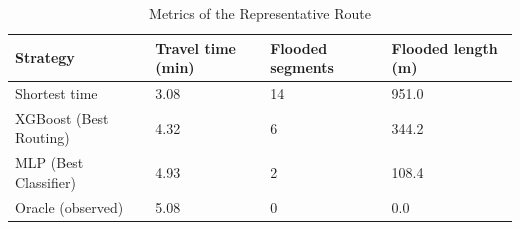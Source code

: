 \begin{table}
\caption{Metrics of the Representative Route}
\label{tab:rep_route}
\begin{tabular}{llll}
\toprule
Strategy & Travel time (min) & Flooded segments & Flooded length (m) \\
\midrule
Shortest time & 3.08 & 14 & 951.0 \\
XGBoost (Best Routing) & 4.32 & 6 & 344.2 \\
MLP (Best Classifier) & 4.93 & 2 & 108.4 \\
Oracle (observed) & 5.08 & 0 & 0.0 \\
\bottomrule
\end{tabular}
\end{table}
